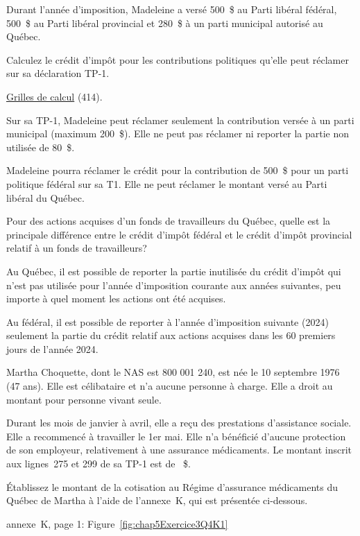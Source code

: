 \begin{question}
	Durant l'année d'imposition, Madeleine a versé 500~\$ au Parti libéral fédéral, 500~\$ au Parti libéral provincial et 280~\$ à un parti municipal autorisé au Québec. 
	
	Calculez le crédit d'impôt pour les contributions politiques qu'elle peut réclamer sur sa déclaration TP-1.
	
	\href{https://www.revenuquebec.ca/documents/fr/formulaires/tp/2023-12/TP-1.D.GR%282023-12%29.pdf}{Grilles de calcul} (414).
\end{question}
Sur sa TP-1, Madeleine peut réclamer seulement la contribution versée à un parti municipal (maximum 200~\$). Elle ne peut pas réclamer ni reporter la partie non utilisée de 80~\$.

Madeleine pourra réclamer le crédit pour la contribution de 500~\$ pour un parti politique fédéral sur sa T1. Elle ne peut réclamer le montant versé au Parti libéral du Québec.

\begin{question}
	Pour des actions acquises d'un fonds de travailleurs du Québec, quelle est la principale différence entre le crédit d'impôt fédéral et le crédit d'impôt provincial relatif à un fonds de travailleurs?
\end{question}
Au Québec, il est possible de reporter la partie inutilisée du crédit d'impôt qui n'est pas utilisée pour l'année d'imposition courante aux années suivantes, peu importe à quel moment les actions ont été acquises.

Au fédéral, il est possible de reporter à l'année d'imposition suivante (2024) seulement la partie du crédit relatif aux actions acquises dans les 60 premiers jours de l'année 2024.

\begin{question}
	Martha Choquette, dont le NAS est 800 001 240, est née le 10 septembre 1976 (47 ans). Elle est célibataire et n'a aucune personne à charge. Elle a droit au montant pour personne vivant seule.
	
	Durant les mois de janvier à avril, elle a reçu des prestations d'assistance sociale. Elle a recommencé à travailler le 1er mai. Elle n'a bénéficié d'aucune protection de son employeur, relativement à une assurance médicaments. Le montant inscrit aux lignes~275 et 299 de sa TP-1 est de ~\$.
	
	Établissez le montant de la cotisation au Régime d'assurance médicaments du Québec de Martha à l'aide de l'annexe~K, qui est présentée ci-dessous. 
\end{question}
annexe~K, page 1: Figure~\ref{fig:chap5Exercice3Q4K1}

